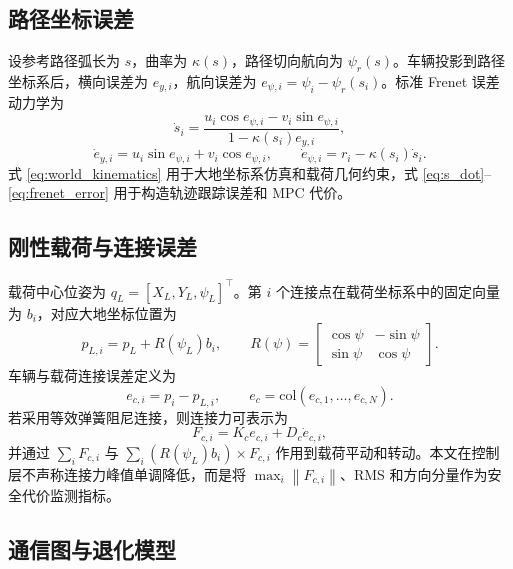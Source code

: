 \documentclass[twocolumn,3p,times,procedia]{elsarticle}
\newcommand{\norm}[1]{\left\lVert #1 \right\rVert}
\begin{document}
\subsection{路径坐标误差}

设参考路径弧长为 $s$，曲率为 $\kappa(s)$，路径切向航向为 $\psi_r(s)$。车辆投影到路径坐标系后，横向误差为 $e_{y,i}$，航向误差为 $e_{\psi,i}=\psi_i-\psi_r(s_i)$。标准 Frenet 误差动力学为
\begin{equation}
\dot s_i=\frac{u_i\cos e_{\psi,i}-v_i\sin e_{\psi,i}}
{1-\kappa(s_i)e_{y,i}},
\label{eq:s_dot}
\end{equation}
\begin{equation}
\dot e_{y,i}=u_i\sin e_{\psi,i}+v_i\cos e_{\psi,i},\qquad
\dot e_{\psi,i}=r_i-\kappa(s_i)\dot s_i .
\label{eq:frenet_error}
\end{equation}
式 \eqref{eq:world_kinematics} 用于大地坐标系仿真和载荷几何约束，式 \eqref{eq:s_dot}--\eqref{eq:frenet_error} 用于构造轨迹跟踪误差和 MPC 代价。

\subsection{刚性载荷与连接误差}

载荷中心位姿为 $q_L=[X_L,Y_L,\psi_L]^\top$。第 $i$ 个连接点在载荷坐标系中的固定向量为 $b_i$，对应大地坐标位置为
\begin{equation}
p_{L,i}=p_L+R(\psi_L)b_i,\qquad
R(\psi)=\begin{bmatrix}\cos\psi&-\sin\psi\\ \sin\psi&\cos\psi\end{bmatrix}.
\label{eq:payload_anchor}
\end{equation}
车辆与载荷连接误差定义为
\begin{equation}
e_{c,i}=p_i-p_{L,i},\qquad
e_c=\mathrm{col}(e_{c,1},\ldots,e_{c,N}).
\label{eq:connection_error}
\end{equation}
若采用等效弹簧阻尼连接，则连接力可表示为
\begin{equation}
F_{c,i}=K_c e_{c,i}+D_c\dot e_{c,i},
\label{eq:connection_force}
\end{equation}
并通过 $\sum_i F_{c,i}$ 与 $\sum_i (R(\psi_L)b_i)\times F_{c,i}$ 作用到载荷平动和转动。本文在控制层不声称连接力峰值单调降低，而是将 $\max_i\norm{F_{c,i}}$、RMS 和方向分量作为安全代价监测指标。

\subsection{通信图与退化模型}
\end{document}
